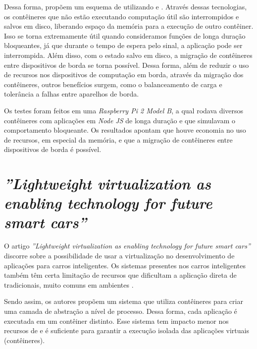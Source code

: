 Dessa forma,  propõem um esquema de \checkpointing utilizando \docker e \criu. Através dessas tecnologias, os contêineres que não estão executando computação útil são interrompidos e salvos em disco, liberando espaço da memória para a execução de outro contêiner. Isso se torna extremamente útil quando consideramos funções de longa duração bloqueantes, já que durante o tempo de espera pelo sinal, a aplicação pode ser interrompida. Além disso, com o estado salvo em disco, a migração de contêineres entre dispositivos \iot de borda se torna possível. Dessa forma, além de reduzir o uso de recursos nos dispositivos de computação em borda, através da migração dos contêineres, outros benefícios surgem, como o balanceamento de carga e tolerância a falhas entre aparelhos \iot de borda.

Os testes foram feitos em uma \textit{Raspberry Pi 2 Model B}, a qual rodava diversos contêineres com aplicações em \textit{Node JS} de longa duração e que simulavam o comportamento bloqueante. Os resultados apontam que houve economia no uso de recursos, em especial da memória, e que a migração de contêineres entre dispositivos \iot de borda é possível.

\section{ \textit{''Lightweight virtualization as enabling technology for future smart cars''}}\label{sec.rw-3}

O artigo \textit{''Lightweight virtualization as enabling technology for future smart cars''} \cite{smartcarslwvirtualization} discorre sobre a possibilidade de usar a virtualização no desenvolvimento de aplicações para carros inteligentes. Os sistemas presentes nos carros inteligentes também têm certa limitação de recursos que dificultam a aplicação direta de \hypervisors tradicionais, muito comuns em ambientes \cloud.

Sendo assim, os autores propõem um sistema que utiliza contêineres \docker para criar uma camada de abstração a nível de processo. Dessa forma, cada aplicação é executada em um contêiner distinto. Esse sistema tem impacto menor nos recursos de \hardware e é suficiente para garantir a execução isolada das aplicações virtuais (contêineres).

